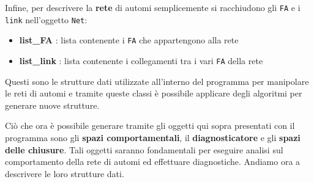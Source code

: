 Infine, per descrivere la \textbf{rete} di automi semplicemente si racchiudono gli \texttt{FA} e i \texttt{link} nell'oggetto \texttt{Net}:
\begin{itemize}
    \item \textbf{list\_FA} : lista contenente i \texttt{FA} che appartengono alla rete
    \item \textbf{list\_link} : lista contenente i collegamenti tra i vari \texttt{FA} della rete
\end{itemize}

Questi sono le strutture dati utilizzate all'interno del programma per manipolare le reti di automi e tramite queste classi è possibile applicare degli algoritmi per generare nuove strutture. \newline

Ciò che ora è possibile generare tramite gli oggetti qui sopra presentati con il programma sono gli \textbf{spazi comportamentali}, il \textbf{diagnosticatore} e gli \textbf{spazi delle chiusure}. 
Tali oggetti saranno fondamentali per eseguire analisi sul comportamento della rete di automi ed effettuare diagnostiche. Andiamo ora a descrivere le loro strutture dati. \newline

